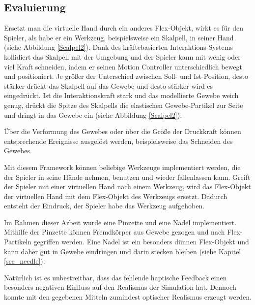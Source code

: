 \subsection{Evaluierung}
Ersetzt man die virtuelle Hand durch ein anderes Flex-Objekt, wirkt es für den Spieler, als habe er ein Werkzeug, beispielsweise ein Skalpell, in seiner Hand (siehe Abbildung \ref{Scalpel2}). 
Dank des kräftebasierten Interaktions-Systems kollidiert das Skalpell mit der Umgebung und der Spieler kann mit wenig oder viel Kraft schneiden, indem er seinen Motion Controller unterschiedlich bewegt und positioniert. Je größer der Unterschied zwischen Soll- und Ist-Position, desto stärker drückt das Skalpell auf das Gewebe und desto stärker wird es eingedrückt. Ist die Interaktionskraft stark und das modellierte Gewebe weich genug, drückt die Spitze des Skalpells die elastischen Gewebe-Partikel zur Seite und dringt in das Gewebe ein (siehe Abbildung \ref{Scalpel2}).


Über die Verformung des Gewebes oder über die Größe der Druckkraft können entsprechende Ereignisse ausgelöst werden, beispielsweise das Schneiden des Gewebes.

Mit diesem Framework können beliebige Werkzeuge implementiert werden, die der Spieler in seine Hände nehmen, benutzen und wieder fallenlassen kann. Greift der Spieler mit einer virtuellen Hand nach einem Werkzeug, wird das Flex-Objekt der virtuellen Hand mit dem Flex-Objekt des Werkzeugs ersetzt. Dadurch entsteht der Eindruck, der Spieler habe das Werkzeug aufgehoben.

Im Rahmen dieser Arbeit wurde eine Pinzette und eine Nadel implementiert. Mithilfe der Pinzette können Fremdkörper aus Gewebe gezogen und nach Flex-Partikeln gegriffen werden. Eine Nadel ist ein besonders dünnen Flex-Objekt und kann daher gut in Gewebe eindringen und darin stecken bleiben (siehe Kapitel \ref{sec_needle}).


Natürlich ist es unbestreitbar, dass das fehlende haptische Feedback einen besonders negativen Einfluss auf den Realismus der Simulation hat. Dennoch konnte mit den gegebenen Mitteln zumindest optischer Realismus erzeugt werden.


